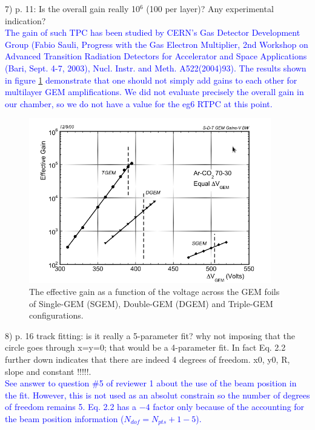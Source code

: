 7) p. 11: Is the overall gain really 10$^6$ (100 per layer)? Any experimental 
indication?\\
\textcolor{blue}{
     The gain of such TPC has been studied by CERN's Gas Detector Development 
Group (Fabio Sauli, Progress with the Gas Electron Multiplier, 2nd Workshop on 
Advanced Transition Radiation Detectors for Accelerator and Space Applications 
(Bari, Sept. 4-7, 2003), Nucl. Instr. and Meth. A522(2004)93). The results 
shown in figure \ref{fig:gem_gains} demonstrate that one should not simply add 
gains to each other for multilayer GEM amplifications. We did not evaluate 
precisely the overall gain in our chamber, so we do not have a value for the 
eg6 RTPC at this point.}\\


\begin{figure}[tbp]
\centering
\includegraphics[height=7.2cm]{fig/GEM_gains.png}
\caption{ The effective gain as a function of the voltage across the GEM foils 
of Single-GEM (SGEM), Double-GEM (DGEM) and Triple-GEM configurations.}
\label{fig:gem_gains}
\end{figure}


8) p. 16 track fitting: is it really a 5-parameter fit? why not imposing that the 
circle goes through x=y=0; that would be a 4-parameter fit. In fact Eq. 2.2 
further down indicates that there are indeed 4 degrees of freedom.
    x0, y0, R, slope and constant !!!!!.\\
   \textcolor{blue}{See answer to question \#5 of reviewer 1 about the use of
   the beam position in the fit. However, this is not used as an absolut constrain
   so the number of degrees of freedom remains 5. Eq. 2.2 has a $-4$ factor 
only because of the accounting for the beam position information ($N_{dof} = 
N_{pts} +1 -5$).}\\

